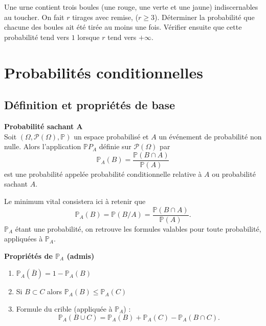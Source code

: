 \documentclass[../PolyS4.tex]{subfiles}
\begin{document}

Une urne contient trois boules (une rouge, une verte et une jaune) indiscernables au toucher. On fait $r$ tirages avec remise, ($r \geq 3$). Déterminer la probabilité que chacune des boules ait été tirée au moins une fois. Vérifier ensuite que cette probabilité tend vers $1$ lorsque $r$ tend vers $+\infty$.\\




\section{Probabilités conditionnelles}
\subsection{Définition et propriétés de base}

\begin{Def}\textbf{Probabilité sachant A}\\

 Soit $(\Omega, \mathcal{P}(\Omega), \mathbb{P})$ un espace probabilisé et $A$ un événement de probabilité non nulle. Alors l'application $\mathbb{P}P_A$ définie sur $\mathcal{P}(\Omega)$ par 
\[
\mathbb{P}_A(B) = \frac{\mathbb{P}(B \cap A)}{\mathbb{P}(A)}
\]
est une probabilité appelée probabilité conditionnelle relative à $A$ ou probabilité sachant $A$.\\
\end{Def}

\begin{Rmq}  Le minimum vital consistera ici à retenir que 
\[
\mathbb{P}_A(B)= \mathbb{P}(B/A) = \frac{\mathbb{P}(B \cap A)}{\mathbb{P}(A)}.
\]
$\mathbb{P}_A$ étant une probabilité, on retrouve les formules valables pour toute probabilité, appliquées à $\mathbb{P}_A$.\\
\end{Rmq} 

\begin{Prop}\textbf{Propriétés de $\mathbb{P}_A$ (admis)}\\

\begin{enumerate}
    \item $\mathbb{P}_A(\bar{B}) = 1 - \mathbb{P}_A(B)$
    \item Si $B \subset C$ alors $\mathbb{P}_A(B) \leq \mathbb{P}_A(C)$
    \item Formule du crible (appliquée à $\mathbb{P}_A$) : 
    \[
    \mathbb{P}_A(B \cup C) = \mathbb{P}_A(B) + \mathbb{P}_A(C) - \mathbb{P}_A(B \cap C).
    \]
\end{enumerate}
\end{Prop}
\end{document}
